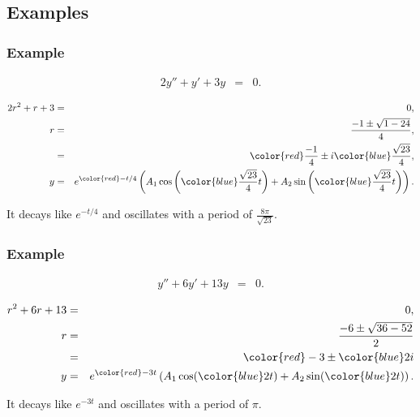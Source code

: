 \subsection{Examples}

\begin{frame}
  \frametitle{Example}

  \begin{eqnarray*}
    2y'' + y' + 3y & = & 0.
  \end{eqnarray*}
  
  {
    \begin{eqnarray*}
      2r^2+r+3 & = & 0, \\
      r & = & \frac{-1\pm\sqrt{1-24}}{4}, \\
      & = & {\color{red}\frac{-1}{4}} \pm i{\color{blue}\frac{\sqrt{23}}{4}}, \\
      y & = & e^{{\color{red}-t/4}} 
      \lp A_1 \cos\lp {\color{blue}\frac{\sqrt{23}}{4} t} \rp + A_2 \sin\lp {\color{blue}\frac{\sqrt{23}}{4} t} \rp \rp.
    \end{eqnarray*}

    It decays like $e^{-t/4}$ and oscillates with a period of $\frac{8\pi}{\sqrt{23}}$.
  }

\end{frame}


\begin{frame}
  \frametitle{Example}

  \begin{eqnarray*}
    y'' + 6 y' + 13y & = & 0.
  \end{eqnarray*}

  {
    \begin{eqnarray*}
      r^2 + 6r + 13 & = & 0, \\
      r & = & \frac{-6\pm\sqrt{36-52}}{2} \\
      & = & {\color{red}-3} \pm {\color{blue}2i} \\
      y & = & e^{{\color{red}-3t}} \lp A_1 \cos({\color{blue}2t}) + A_2 \sin({\color{blue}2t}) \rp.
    \end{eqnarray*}

    It decays like $e^{-3t}$ and oscillates with a period of $\pi$.
  }

\end{frame}


